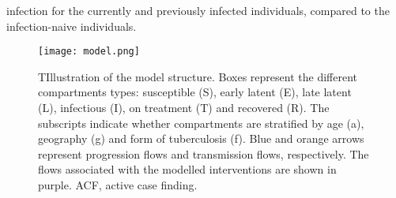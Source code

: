infection for the currently and previously infected individuals, compared to the infection-naive 
individuals.
\begin{figure}[!htbp]
    \texttt{[image: model.png]}
    \caption{TIllustration of the model structure. 
    Boxes represent the different compartments types: susceptible (S), early latent (E), late latent (L), infectious (I), on treatment (T) and recovered (R). The subscripts indicate whether compartments are stratified by age (a), geography (g) and form of tuberculosis (f). Blue and orange arrows represent progression flows and transmission flows, respectively. 
    The flows associated with the modelled interventions are shown in purple. ACF, active case finding.}
    \label{fig:model}
\end{figure}

